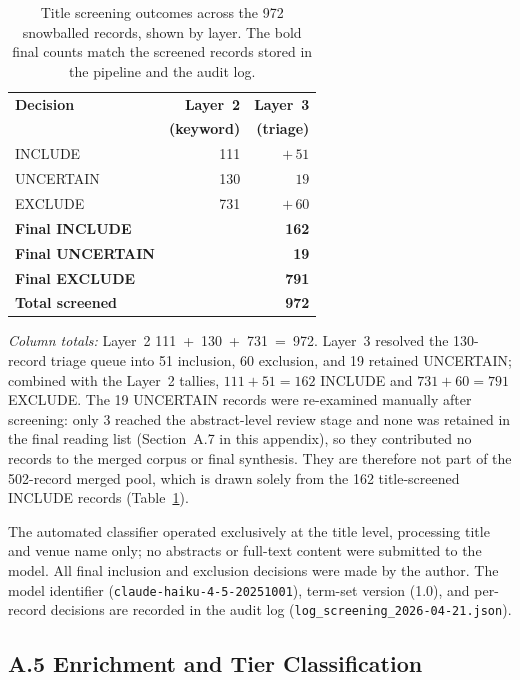 \begin{table}[H]
\centering
\caption{Title screening outcomes across the 972 snowballed records, shown by
layer. The bold final counts match the screened records stored in the pipeline
and the audit log.}
\label{tab:screening}
\begin{tabular}{lrr}
\toprule
\textbf{Decision} & \textbf{Layer~2} & \textbf{Layer~3} \\
 & \textbf{(keyword)} & \textbf{(triage)} \\
\midrule
INCLUDE           & 111 & ${+}\,51$ \\
UNCERTAIN         & 130 & $\phantom{+}19$ \\
EXCLUDE           & 731 & ${+}\,60$ \\
\midrule
\textbf{Final INCLUDE}   & \multicolumn{2}{r}{\textbf{162}} \\
\textbf{Final UNCERTAIN} & \multicolumn{2}{r}{\textbf{19}} \\
\textbf{Final EXCLUDE}   & \multicolumn{2}{r}{\textbf{791}} \\
\midrule
\textbf{Total screened}  & \multicolumn{2}{r}{\textbf{972}} \\
\bottomrule
\end{tabular}
\end{table}
\vspace*{-2pt}
\emph{Column totals:} Layer~2 \mbox{111 + 130 + 731 = 972}. Layer~3 resolved
the 130-record triage queue into 51 inclusion, 60 exclusion, and 19 retained
UNCERTAIN; combined with the Layer~2 tallies, $111{+}51{=}162$ INCLUDE and
$731{+}60{=}791$ EXCLUDE. The 19 UNCERTAIN records were re-examined manually after screening: only 3
reached the abstract-level review stage and none was retained in the final
reading list (Section~A.7 in this appendix), so they contributed no records
to the merged corpus or final synthesis. They are therefore not part of the
502-record merged pool, which is drawn solely from the 162 title-screened
INCLUDE records (Table~\ref{tab:screening}).

The automated classifier operated exclusively at the title level, processing
title and venue name only; no abstracts or full-text content were submitted
to the model. All final inclusion and exclusion decisions were made by the
author. The model identifier (\texttt{claude-haiku-4-5-20251001}), term-set
version (1.0), and per-record decisions are recorded in the audit log
(\texttt{log\_screening\_2026-04-21.json}).

\subsection*{A.5 Enrichment and Tier Classification}

